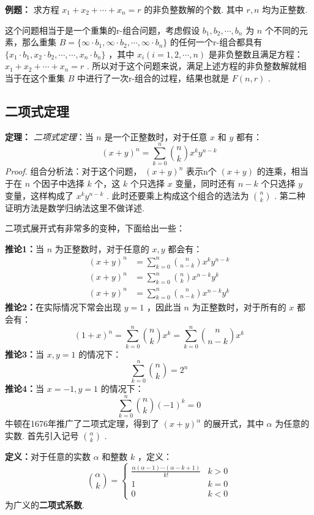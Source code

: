 \documentclass[cn, hazy, blue, normal, 12pt]{elegantnote}
\begin{document}
\textbf{例题：} 求方程 $ x_1+x_2+\cdots+x_n=r $ 的非负整数解的个数. 其中 $ r,n $ 均为正整数.

这个问题相当于是一个重集的r-组合问题，考虑假设 $ b_1,b_2,\cdots,b_n $ 为 $ n $ 个不同的元素，那么重集 $ B=\{\infty \cdot b_1,\infty \cdot b_2,\cdots,\infty\cdot b_n\} $ 的任何一个r-组合都具有 $ \{x_1\cdot b_1,x_2\cdot b_2,\cdots,\cdots,x_n\cdot b_n\} $ ，其中 $ x_i(i=1,2,\cdots,n) $ 是非负整数且满足方程： $ x_1+x_2+\cdots+x_n=r $ . 所以对于这个问题来说，满足上述方程的非负整数解就相当于在这个重集 $ B $ 中进行了一次r-组合的过程，结果也就是 $ F(n,r) $ .

\subsection{二项式定理}

\textbf{定理：} \textit{二项式定理}：当 $ n $ 是一个正整数时，对于任意 $ x $ 和 $ y $ 都有：
$$
    (x+y)^n=\sum_{k=0}^n \binom{n}{k}x^k y^{n-k}
$$
\textit{Proof.} 组合分析法：对于这个问题， $ (x+y)^n $ 表示n个 $ (x+y) $ 的连乘，相当于在 $ n $ 个因子中选择 $ k $ 个，这 $ k $ 个只选择 $ x $ 变量，同时还有 $ n-k $ 个只选择 $ y $ 变量，这样构成了 $ x^ky^{n-k} $ . 此时还要乘上构成这个组合的选法为 $ \binom{n}{k} $ . 第二种证明方法是数学归纳法这里不做详述.

二项式展开式有非常多的变种，下面给出一些：

\textbf{推论1：}当 $ n $ 为正整数时，对于任意的 $ x,y $ 都会有：
$$
    \begin{align}
        (x+y)^n & =\sum_{k=0}^{n}\binom{n}{n-k}x^ky^{n-k}   \\
        (x+y)^n & =\sum_{k=0}^{n}\binom{n}{k}x^{n-k}y^{k}   \\
        (x+y)^n & =\sum_{k=0}^{n}\binom{n}{n-k}x^{n-k}y^{k}
    \end{align}
$$
\textbf{推论2：}在实际情况下常会出现 $ y=1 $ ，因此当 $ n $ 为正整数时，对于所有的 $ x $ 都会有：
$$
    (1+x)^n=\sum_{k=0}^n \binom{n}{k}x^k=\sum_{k=0}^n \binom{n}{n-k}x^k
$$
\textbf{推论3：}当 $ x,y=1 $ 的情况下：
$$
    \sum_{k=0}^n \binom{n}{k}=2^n
$$
\textbf{推论4：}当 $ x=-1,y=1 $ 的情况下：
$$
    \sum_{k=0}^n\binom{n}{k}(-1)^k=0
$$
牛顿在1676年推广了二项式定理，得到了 $ (x+y)^{\alpha} $ 的展开式，其中 $ \alpha $ 为任意的实数. 首先引入记号 $ \binom{\alpha}{k} $ .

\textbf{定义：}对于任意的实数 $ \alpha $ 和整数 $ k $ ，定义：
$$
    \binom{\alpha}{k}=
    \begin{cases}
        \frac{\alpha (\alpha-1)\cdots(\alpha-k+1)}{k!} & k>0 \\
        1                                              & k=0 \\
        0                                              & k<0
    \end{cases}
$$
为广义的\textbf{二项式系数}.
\end{document}
